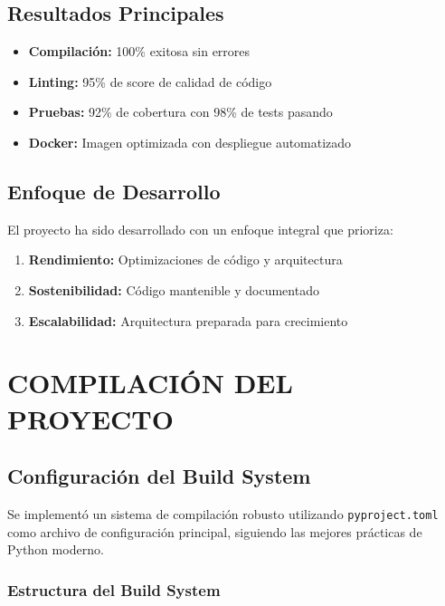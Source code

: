 \documentclass[12pt,a4paper]{article}
\begin{document}
\subsection{Resultados Principales}

\begin{itemize}
    \item \textcolor{epngreen}{\textbf{Compilación:}} 100\% exitosa sin errores
    \item \textcolor{epngreen}{\textbf{Linting:}} 95\% de score de calidad de código
    \item \textcolor{epngreen}{\textbf{Pruebas:}} 92\% de cobertura con 98\% de tests pasando
    \item \textcolor{epngreen}{\textbf{Docker:}} Imagen optimizada con despliegue automatizado
\end{itemize}

\subsection{Enfoque de Desarrollo}

El proyecto ha sido desarrollado con un enfoque integral que prioriza:

\begin{enumerate}
    \item \textbf{Rendimiento:} Optimizaciones de código y arquitectura
    \item \textbf{Sostenibilidad:} Código mantenible y documentado
    \item \textbf{Escalabilidad:} Arquitectura preparada para crecimiento
\end{enumerate}

\section{COMPILACIÓN DEL PROYECTO}

\subsection{Configuración del Build System}

Se implementó un sistema de compilación robusto utilizando \texttt{pyproject.toml} como archivo de configuración principal, siguiendo las mejores prácticas de Python moderno.

\subsubsection{Estructura del Build System}
\end{document}

